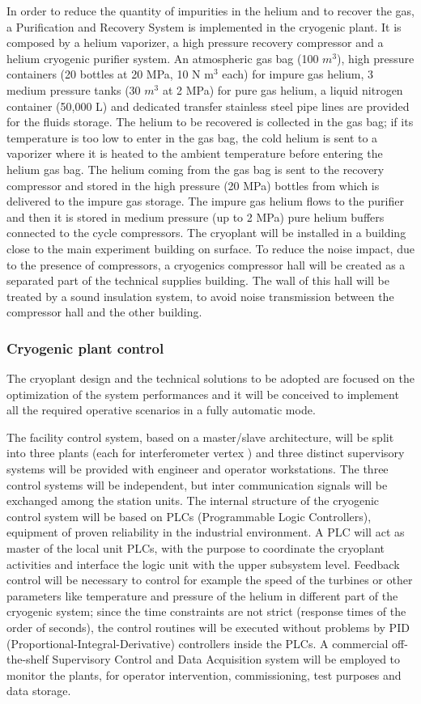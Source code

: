In order to reduce the quantity of impurities in the helium and to recover the gas, a Purification and Recovery System is implemented in the cryogenic plant. It is composed by a helium vaporizer, a high pressure recovery compressor and a helium cryogenic purifier system. An atmospheric gas bag (100 $m^3$), high pressure containers (20 bottles at 20 MPa, 10 N m$^3$ each) for impure gas helium, 3 medium pressure tanks (30 $m^3$ at 2 MPa) for pure gas helium, a liquid nitrogen container (50,000 L) and dedicated transfer stainless steel pipe lines are provided for the fluids storage. The helium to be recovered is collected in the gas bag; if its temperature is too low to enter in the gas bag, the cold helium is sent to a vaporizer where it is heated to the ambient temperature before entering the helium gas bag. The helium coming from the gas bag is sent to the recovery compressor and stored in the high pressure (20 MPa) bottles from which is delivered to the impure gas storage. The impure gas helium flows to the purifier and then it is stored in medium pressure (up to 2 MPa) pure helium buffers connected to the cycle compressors. The cryoplant will be installed in a building close to the main experiment building on surface. To reduce the noise impact, due to the presence of compressors, a cryogenics compressor hall will be created as a separated part of the technical supplies building. The wall of this hall will be treated by a sound insulation system, to avoid noise transmission between the compressor hall and the other building. 

\subsubsection{Cryogenic plant control}
The cryoplant design and the technical solutions to be adopted are focused on the optimization of the system performances and it will be conceived to implement all the required operative scenarios in a fully automatic mode. 

The facility control system, based on a master/slave architecture, will be split into three plants (each for interferometer vertex ) and three distinct supervisory systems will be provided with engineer and operator workstations. The three control systems will be independent, but inter communication signals will be exchanged among the station units. The internal structure of the cryogenic control system will be based on PLCs (Programmable Logic Controllers), equipment of proven reliability in the industrial environment. A PLC will act as master of the local unit PLCs, with the purpose to coordinate the cryoplant activities and interface the logic unit with the upper subsystem level. Feedback control will be necessary to control for example the speed of the turbines or other parameters like temperature and pressure of the helium in different part of the cryogenic system; since the time constraints are not strict (response times of the order of seconds), the control routines will be executed without problems by PID (Proportional-Integral-Derivative) controllers inside the PLCs. A commercial off-the-shelf Supervisory Control and Data Acquisition system will be employed to monitor the plants, for operator intervention, commissioning, test purposes and data storage. 
